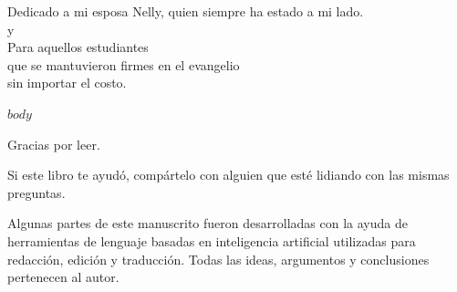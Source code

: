 \documentclass[12pt,oneside]{book}
\begin{document}
\begin{center}

Dedicado a mi esposa Nelly,
quien siempre ha estado a mi lado.\\

y\\

Para aquellos estudiantes \\
que se mantuvieron firmes en el evangelio\\
sin importar el costo.
\end{center}

\clearpage

\renewcommand{\contentsname}{Índice}
\tableofcontents

\clearpage

$body$

\clearpage
\thispagestyle{empty}

\vspace*{4cm}

\begin{center}

Gracias por leer.

\vspace{1cm}

Si este libro te ayudó, compártelo 
con alguien que esté lidiando con las mismas preguntas.\\

\vspace{1cm}

{\footnotesize
Algunas partes de este manuscrito fueron desarrolladas con la ayuda de herramientas
de lenguaje basadas en inteligencia artificial utilizadas para redacción, edición y
traducción. Todas las ideas, argumentos y conclusiones pertenecen al autor.
}

\end{center}
\end{document}
